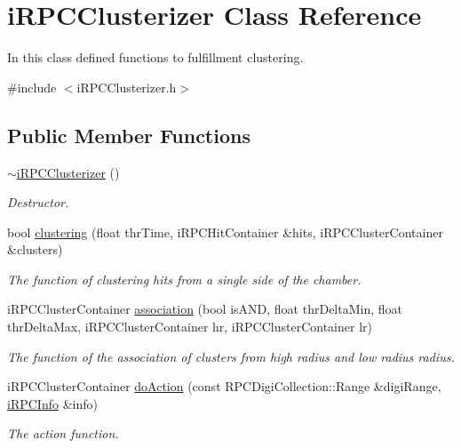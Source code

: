 \hypertarget{classiRPCClusterizer}{\section{i\-R\-P\-C\-Clusterizer Class Reference}
\label{classiRPCClusterizer}
}


In this class defined functions to fulfillment clustering.  




{\ttfamily \#include $<$i\-R\-P\-C\-Clusterizer.\-h$>$}

\subsection*{Public Member Functions}
\begin{DoxyCompactItemize}
\item 
\hypertarget{classiRPCClusterizer_a21fb43e9765babca68dd245677e9e6e6}{\hyperlink{classiRPCClusterizer_a21fb43e9765babca68dd245677e9e6e6}{$\sim$i\-R\-P\-C\-Clusterizer} ()}\label{classiRPCClusterizer_a21fb43e9765babca68dd245677e9e6e6}

\begin{DoxyCompactList}\small\item\em Destructor. \end{DoxyCompactList}\item 
bool \hyperlink{classiRPCClusterizer_a7af579c4a8a834d52aa06c279198d36d}{clustering} (float thr\-Time, i\-R\-P\-C\-Hit\-Container \&hits, i\-R\-P\-C\-Cluster\-Container \&clusters)
\begin{DoxyCompactList}\small\item\em The function of clustering hits from a single side of the chamber. \end{DoxyCompactList}\item 
i\-R\-P\-C\-Cluster\-Container \hyperlink{classiRPCClusterizer_abde7fc397d9ee2ff83be54490fa65f31}{association} (bool is\-A\-N\-D, float thr\-Delta\-Min, float thr\-Delta\-Max, i\-R\-P\-C\-Cluster\-Container hr, i\-R\-P\-C\-Cluster\-Container lr)
\begin{DoxyCompactList}\small\item\em The function of the association of clusters from high radius and low radius radius. \end{DoxyCompactList}\item 
i\-R\-P\-C\-Cluster\-Container \hyperlink{classiRPCClusterizer_ae285bba92533f81799107e26a408e3a1}{do\-Action} (const R\-P\-C\-Digi\-Collection\-::\-Range \&digi\-Range, \hyperlink{classiRPCInfo}{i\-R\-P\-C\-Info} \&info)
\begin{DoxyCompactList}\small\item\em The action function. \end{DoxyCompactList}\end{DoxyCompactItemize}


